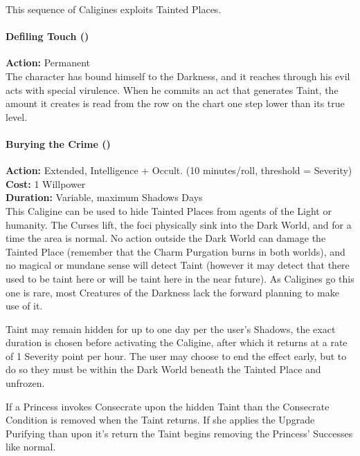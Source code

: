 This sequence of Caligines exploits Tainted Places.  \\

\paragraph*{Defiling Touch (\textbullet)}

\noindent \textbf{Action:} Permanent\\

\noindent The character has bound himself to the Darkness, and it reaches through his evil acts with special virulence. When he commits an act that generates Taint, the amount it creates is read from the row on the chart one step lower than its true level.

\paragraph*{Burying the Crime (\textbullet\textbullet)}

\noindent \textbf{Action:} Extended, Intelligence + Occult. (10 minutes/roll, threshold = Severity)\\

\noindent \textbf{Cost:} 1 Willpower\\

\noindent \textbf{Duration:} Variable, maximum Shadows Days \\

\noindent This Caligine can be used to hide Tainted Places from agents of the Light or humanity. The Curses lift, the foci physically sink into the Dark World, and for a time the area is normal. No action outside the Dark World can damage the Tainted Place (remember that the Charm Purgation burns in both worlds), and no magical or mundane sense will detect Taint (however it may detect that there used to be taint here or will be taint here in the near future). As Caligines go this one is rare, most Creatures of the Darkness lack the forward planning to make use of it.

Taint may remain hidden for up to one day per the user's Shadows, the exact duration is chosen before activating the Caligine, after which it returns at a rate of 1 Severity point per hour. The user may choose to end the effect early, but to do so they must be within the Dark World beneath the Tainted Place and unfrozen.

If a Princess invokes Consecrate upon the hidden Taint than the Consecrate Condition is removed when the Taint returns. If she applies the Upgrade Purifying than upon it's return the Taint begins removing the Princess' Successes like normal.  \\

